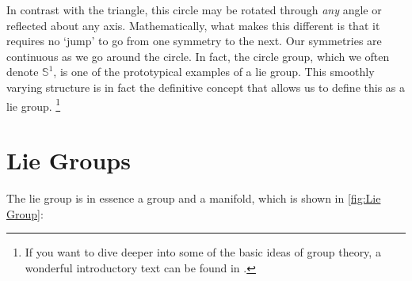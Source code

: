 In contrast with the triangle, this circle may be rotated through \textit{any} angle or reflected about any axis. Mathematically, what makes this different is that it requires no `jump' to go from one symmetry to the next. Our symmetries are continuous as we go around the circle. In fact, the circle group, which we often denote $\mathbb{S}^1$, is one of the prototypical examples of a \gls{lie group}. This smoothly varying structure is in fact the definitive concept that allows us to define this as a \gls{lie group}.
\footnote{If you want to dive deeper into some of the basic ideas of group theory, a wonderful introductory text can be found in \cite{armstrong_groups_1988}.}

\section{Lie Groups}
The \gls{lie group} is in essence a group and a manifold, which is shown in \autoref{fig:Lie Group}:
